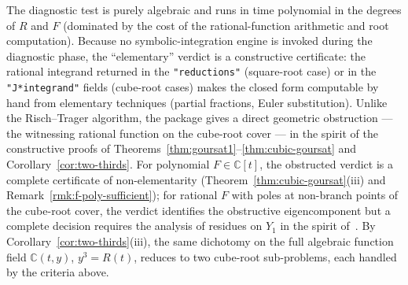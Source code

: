 \documentclass[11pt,a4paper]{article}
\theoremstyle{plain}
\theoremstyle{definition}
\theoremstyle{remark}
\newcommand{\C}{\mathbb{C}}
\begin{document}
\medskip
\noindent
The diagnostic test is purely algebraic and runs in time polynomial in the degrees of $R$ and $F$ (dominated by the cost of the rational-function arithmetic and root computation). Because no symbolic-integration engine is invoked during the diagnostic phase, the ``elementary'' verdict is a constructive certificate: the rational integrand returned in the \texttt{"reductions"} (square-root case) or in the \texttt{"J*integrand"} fields (cube-root cases) makes the closed form computable by hand from elementary techniques (partial fractions, Euler substitution). Unlike the Risch--Trager algorithm, the package gives a direct geometric obstruction --- the witnessing rational function on the cube-root cover --- in the spirit of the constructive proofs of Theorems~\ref{thm:goursat1}--\ref{thm:cubic-goursat} and Corollary~\ref{cor:two-thirds}. For polynomial $F\in\C[t]$, the obstructed verdict is a complete certificate of non-elementarity (Theorem~\ref{thm:cubic-goursat}(iii) and Remark~\ref{rmk:f-poly-sufficient}); for rational $F$ with poles at non-branch points of the cube-root cover, the verdict identifies the obstructive eigencomponent but a complete decision requires the analysis of residues on $Y_1$ in the spirit of~\cite{Trager1984,Bronstein2005}. By Corollary~\ref{cor:two-thirds}(iii), the same dichotomy on the full algebraic function field $\C(t,y)$, $y^3=R(t)$, reduces to two cube-root sub-problems, each handled by the criteria above.
\end{document}
